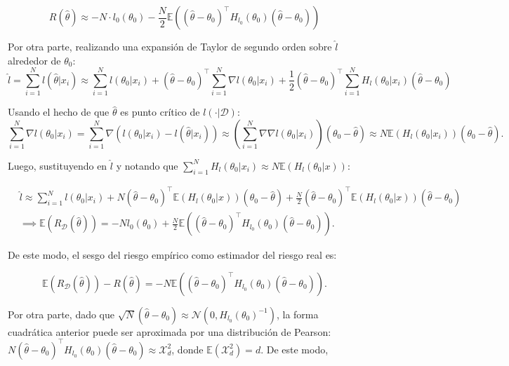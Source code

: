 \begin{equation*}
	R(\hat{\theta}) \approx -N \cdot l_0(\theta_0) - \frac{N}{2}\mathbb{E}\left((\hat{\theta}-\theta_0)^\top H_{l_0}(\theta_0) (\hat{\theta}-\theta_0)\right)
\end{equation*}

Por otra parte, realizando una expansión de Taylor de segundo orden sobre $\hat{l}$ alrededor de $\theta_0$:
\begin{equation}
	\hat{l} = \sum_{i=1}^N l(\hat{\theta}|x_i) \approx \sum_{i=1}^N l(\theta_0|x_i) + (\hat{\theta}-\theta_0)^\top \sum_{i=1}^N \nabla l(\theta_0|x_i) + \frac{1}{2}(\hat{\theta}-\theta_0)^\top \sum_{i=1}^N H_l(\theta_0|x_i) (\hat{\theta}-\theta_0)
\end{equation}

Usando el hecho de que $\hat{\theta}$ es punto crítico de $l(\cdot|\mathcal{D})$:
\begin{equation}
	\sum_{i=1}^N \nabla l(\theta_0|x_i) = \sum_{i=1}^N \nabla \left(l(\theta_0|x_i) - l(\hat{\theta}|x_i)\right) \approx \left(\sum_{i=1}^N \nabla\nabla l(\theta_0|x_i)\right) (\theta_0-\hat{\theta}) \approx N \mathbb{E}(H_l(\theta_0|x_i)) (\theta_0-\hat{\theta}).
\end{equation}

Luego, sustituyendo en $\hat{l}$ y notando que $\sum\limits_{i=1}^N H_l(\theta_0|x_i) \approx N\mathbb{E}(H_l(\theta_0|x))$:

\begin{align}
	&\hat{l} \approx \sum_{i=1}^N l(\theta_0|x_i) + N(\hat{\theta}-\theta_0)^\top \mathbb{E}(H_l(\theta_0|x)) (\theta_0-\hat{\theta}) + \frac{N}{2}(\hat{\theta}-\theta_0)^\top \mathbb{E}(H_l(\theta_0|x)) (\hat{\theta}-\theta_0)\\
	&\implies \mathbb{E}(R_\mathcal{D}(\hat{\theta})) = -Nl_0(\theta_0) + \frac{N}{2} \mathbb{E}\left((\hat{\theta}-\theta_0)^\top H_{l_0}(\theta_0) (\hat{\theta}-\theta_0)\right).
\end{align}

De este modo, el sesgo del riesgo empírico como estimador del riesgo real es:

\begin{equation*}
	\mathbb{E}(R_\mathcal{D}(\hat{\theta})) - R(\hat{\theta}) = -N \mathbb{E}\left((\hat{\theta}-\theta_0)^\top H_{l_0}(\theta_0) (\hat{\theta}-\theta_0)\right).
\end{equation*}

Por otra parte, dado que $\sqrt{N}\left(\hat{\theta}-\theta_0\right)\approx\mathcal{N}\left(0,H_{l_0}(\theta_0)^{-1}\right)$, la forma cuadrática anterior puede ser aproximada por una distribución de Pearson: $N(\hat{\theta}-\theta_0)^\top H_{l_0}(\theta_0) (\hat{\theta}-\theta_0)\approx\mathcal{X}^2_d$, donde $\mathbb{E}(\mathcal{X}^2_d)=d$. De este modo,

